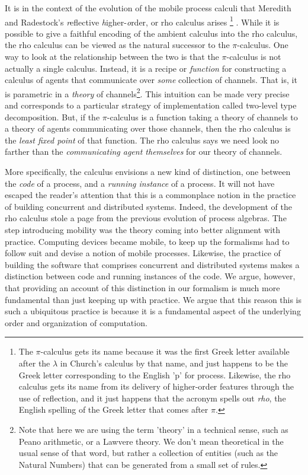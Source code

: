 It is in the context of the evolution of the mobile process calculi
that Meredith and Radestock's \emph{r}eflective
\emph{h}igher-\emph{o}rder, or rho calculus arises \footnote{The
$\pi$-calculus gets its name because it was the first Greek letter
available after the $\lambda$ in Church's calculus by that name, and
just happens to be the Greek letter corresponding to the English 'p'
for process. Likewise, the rho calculus gets its name from its
delivery of higher-order features through the use of reflection, and
it just happens that the acronym spells out \emph{rho}, the English
spelling of the Greek letter that comes after $\pi$.}
\cite{DBLP:journals/entcs/MeredithR05}. While it is possible to give a
faithful encoding of the ambient calculus into the rho calculus, the
rho calculus can be viewed as the natural successor to the
$\pi$-calculus. One way to look at the relationship between the two is
that the $\pi$-calculus is not actually a single calculus. Instead, it
is a recipe or \emph{function} for constructing a calculus of agents
that communicate over \emph{some} collection of channels. That is, it
is parametric in a \emph{theory} of channels\footnote{Note that here
we are using the term 'theory' in a technical sense, such as Peano
arithmetic, or a Lawvere theory. We don't mean theoretical in the
usual sense of that word, but rather a collection of entities (such as
the Natural Numbers) that can be generated from a small set of
rules.}. This intuition can be made very precise and corresponds to a
particular strategy of implementation called two-level type
decomposition. But, if the $\pi$-calculus is a function taking a
theory of channels to a theory of agents communicating over those
channels, then the rho calculus is the \emph{least fixed point} of
that function. The rho calculus says we need look no farther than the
\emph{communicating agent themselves} for our theory of channels.

More specifically, the calculus envisions a new kind of distinction,
one between the \emph{code} of a process, and a \emph{running
instance} of a process. It will not have escaped the reader's
attention that this is a commonplace notion in the practice of
building concurrent and distributed systems. Indeed, the development
of the rho calculus stole a page from the previous evolution of
process algebras. The step introducing mobility was the theory coming
into better alignment with practice. Computing devices became mobile,
to keep up the formalisms had to follow suit and devise a notion of
mobile processes. Likewise, the practice of building the software that
comprises concurrent and distributed systems makes a distinction
between code and running instances of the code. We argue, however,
that providing an account of this distinction in our formalism is much
more fundamental than just keeping up with practice. We argue that
this reason this is such a ubiquitous practice is because it is a
fundamental aspect of the underlying order and organization of
computation.

